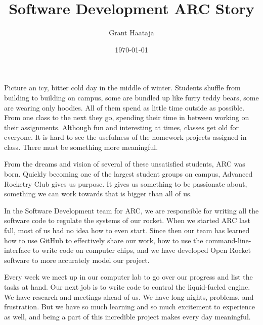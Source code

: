 \documentclass[11pt,final,twoside]{article} %
\title{Software Development ARC Story}
\author{Grant Haataja}
\date{\today}
\begin{document}
	\maketitle

Picture an icy, bitter cold day in the middle of winter. Students shuffle from building to building on campus, some are bundled up like furry teddy bears, some are wearing only hoodies. All of them spend as little time outside as possible. From one class to the next they go, spending their time in between working on their assignments. Although fun and interesting at times, classes get old for everyone. It is hard to see the usefulness of the homework projects assigned in class. There must be something more meaningful.

From the dreams and vision of several of these unsatisfied students, ARC was born. Quickly becoming one of the largest student groups on campus, Advanced Rocketry Club gives us purpose. It gives us something to be passionate about, something we can work towards that is bigger than all of us. 

In the Software Development team for ARC, we are responsible for writing all the software code to regulate the systems of our rocket. When we started ARC last fall, most of us had no idea how to even start. Since then our team has learned how to use GitHub to effectively share our work, how to use the command-line-interface to write code on computer chips, and we have developed Open Rocket software to more accurately model our project. 

Every week we meet up in our computer lab to go over our progress and list the tasks at hand. Our next job is to write code to control the liquid-fueled engine. We have research and meetings ahead of us. We have long nights, problems, and frustration. But we have so much learning and so much excitement to experience as well, and being a part of this incredible project makes every day meaningful.
\end{document}
